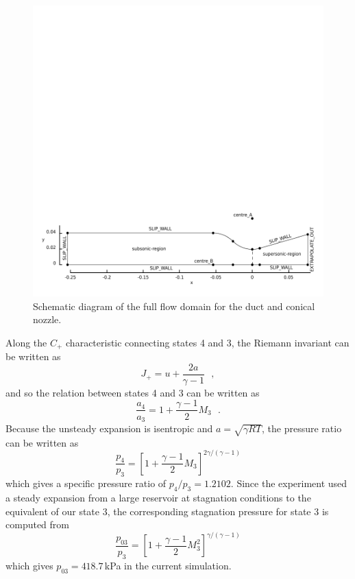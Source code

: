 \begin{figure}[htbp]
\begin{center}
\includegraphics[width=\textwidth,viewport=14 17 439 130,clip=true]{../2D/back-nozzle/back-layout.pdf}
\end{center}
\caption{Schematic diagram of the full flow domain for the duct and conical nozzle.}
\label{back-geometry-fig}
\end{figure}

Along the $C_+$ characteristic connecting states 4 and 3, 
the Riemann invariant can be written as 
$$
    J_+ = u + \frac{2 a}{\gamma - 1} ~~~,
$$
and so the relation between states 4 and 3 can be written as
$$
    \frac{a_4}{a_3} = 1 + \frac{\gamma - 1}{2} M_3 ~~~.
$$
Because the unsteady expansion is isentropic and $a = \sqrt{\gamma R T}$,
the pressure ratio can be written as
$$
    \frac{p_4}{p_3} = \left[ 1 + \frac{\gamma - 1}{2} M_3 
                      \right]^{2 \gamma / (\gamma - 1)}
$$
which gives a specific pressure ratio of $p_4/p_3 = 1.2102$.
Since the experiment used a steady expansion from a large reservoir
at stagnation conditions to the equivalent of our state 3, 
the corresponding stagnation pressure for state 3 is computed from
$$
    \frac{p_{03}}{p_3} = \left[ 1 + \frac{\gamma - 1}{2} M_3^2
                               \right]^{\gamma / (\gamma - 1)} 
$$
which gives $p_{03} = 418.7$\,kPa in the current simulation.

